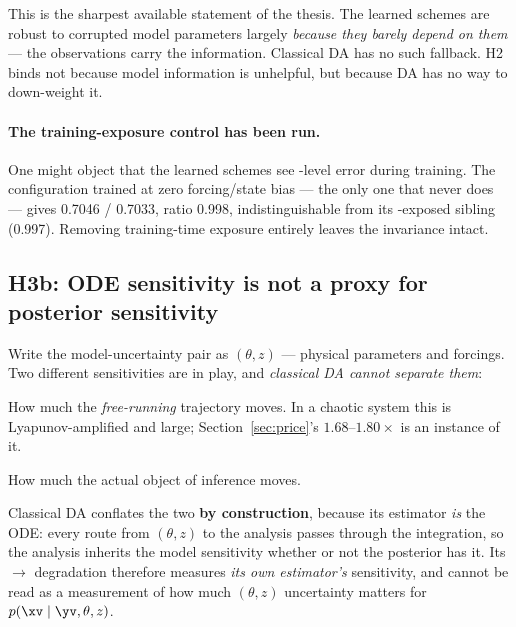 This is the sharpest available statement of the thesis. The learned schemes are
robust to corrupted model parameters largely \emph{because they barely depend on
them} --- the observations carry the information. Classical DA has no such
fallback. H2 binds not because model information is unhelpful, but because DA
has no way to down-weight it.

\paragraph{The training-exposure control has been run.}
One might object that the learned schemes see \So{}-level error during training.
The configuration trained at zero forcing/state bias --- the only one that never
does --- gives \Sz{} 0.7046 / \So{} 0.7033, ratio 0.998, indistinguishable from
its \So{}-exposed sibling (0.997). Removing training-time exposure entirely
leaves the invariance intact.

\subsection{H3b: ODE sensitivity is not a proxy for posterior sensitivity}
\label{sec:sensitivity}

Write the model-uncertainty pair as $(\theta, z)$ --- physical parameters and
forcings. Two different sensitivities are in play, and \emph{classical DA cannot
separate them}:

\begin{description}[leftmargin=2em,style=nextline]
  \item[Model sensitivity, $\partial \xv_{\mathrm{ODE}} / \partial(\theta,z)$.]
    How much the \emph{free-running} trajectory moves. In a chaotic system this
    is Lyapunov-amplified and large; Section~\ref{sec:price}'s
    $1.68$--$1.80\times$ is an instance of it.
  \item[Posterior sensitivity,
        $\partial\, p(\xv \mid \yv, \theta, z) / \partial(\theta,z)$ at fixed $\yv$.]
    How much the actual object of inference moves.
\end{description}

Classical DA conflates the two \textbf{by construction}, because its estimator
\emph{is} the ODE: every route from $(\theta,z)$ to the analysis passes through
the integration, so the analysis inherits the model sensitivity whether or not
the posterior has it. Its \Sz{}$\to$\So{} degradation therefore measures
\emph{its own estimator's} sensitivity, and cannot be read as a measurement of
how much $(\theta,z)$ uncertainty matters for $p(\xv \mid \yv, \theta, z)$.

